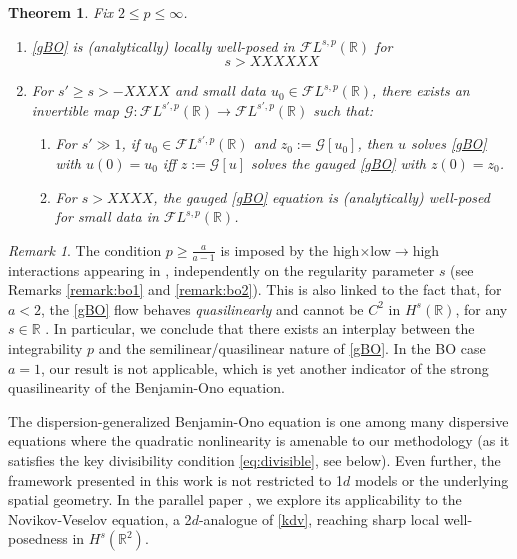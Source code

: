 \documentclass[a4paper,
11pt,  reqno]{amsart}
\newcommand{\5}{\textup{V}}
\newcommand{\FL}{\mathcal{F} L}
\newtheorem*{theorem*}{Theorem}
\theoremstyle{remark}
\newtheorem{remark}[theorem]{Remark}
\newcommand{\R}{\mathbb{R}}
\newcommand{\Gc}{\mathcal{G}}
\numberwithin{equation}{section}
\numberwithin{theorem}{section}
\begin{document}
\begin{theorem*}
Fix $2\le p \le \infty$.
\begin{enumerate}
\item[(i)] \eqref{gBO} is (analytically) locally well-posed in $\FL^{s,p}(\R)$ for
$$
s>XXXXXX
$$

\item[(ii)] For $s'\ge s>-XXXX$ and small data $u_0\in \FL^{s,p}(\R)$, there exists an invertible map $\Gc:\FL^{s',p}(\R)\to \FL^{s',p}(\R)$ such that:

\smallskip 
\begin{enumerate}
\item[(a)] For $s'\gg 1$, if $u_0\in \FL^{s',p}(\R)$ and $z_0:=\Gc[u_0]$, then $u$ solves \eqref{gBO} with $u(0)=u_0$ iff $z:=\Gc[u]$ solves the gauged \eqref{gBO} with $z(0)=z_0$.
\item[(b)] For $s>XXXX$, the gauged \eqref{gBO} equation is (analytically) well-posed for small data in $\FL^{s,p}(\R)$.
\end{enumerate}
\end{enumerate}



\end{theorem*}
\begin{remark}
The condition $p\ge \frac{a}{a-1}$ is imposed by the high$\times$low$\to$high interactions appearing in \cite{herr_bo}, independently on the regularity parameter $s$ (see Remarks \ref{remark:bo1} and \ref{remark:bo2}). This is also linked to the fact that, for $a<2$, the \eqref{gBO} flow behaves \emph{quasilinearly} and cannot be $C^2$ in $H^s(\R)$, for any $s\in \R$ \cite{KochTzvetkov_bo, MolTzeSaut_ill}. In particular, we conclude that there exists an interplay between the integrability $p$ and the semilinear/quasilinear nature of \eqref{gBO}. In the BO case $a=1$, our result is not applicable, which is yet another indicator of the strong quasilinearity of the Benjamin-Ono equation.
\end{remark}


\bigskip

The dispersion-generalized Benjamin-Ono equation is one among many dispersive equations where the quadratic nonlinearity is amenable to our methodology (as it satisfies the key divisibility condition \eqref{eq:divisible}, see below). Even further, the  framework presented in this work is not restricted to 1$d$ models or the underlying spatial geometry.
In the parallel paper \cite{CCR-NV}, we explore its applicability to the Novikov-Veselov equation, a 2$d$-analogue of \eqref{kdv}, reaching sharp local well-posedness in $H^s(\R^2)$.
\end{document}
